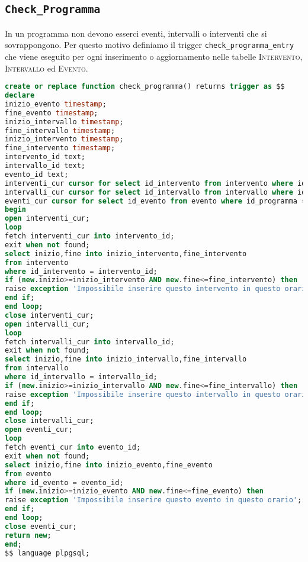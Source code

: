 \subsection{\texttt{Check\_Programma}}
In un programma non devono esserci eventi, intervalli o interventi che si sovrappongono. Per questo motivo definiamo il trigger \texttt{check\_programma\_entry} che viene eseguito per ogni inserimento o aggiornamento nelle tabelle \textsc{Intervento}, \textsc{Intervallo} ed \textsc{Evento}.
\begin{lstlisting}[language=SQL,style=mystyle,caption={check\_programma\_entry}]
create or replace function check_programma() returns trigger as $$
declare
inizio_evento timestamp;
fine_evento timestamp;
inizio_intervallo timestamp;
fine_intervallo timestamp;
inizio_intervento timestamp;
fine_intervento timestamp;
intervento_id text;
intervallo_id text;
evento_id text;
interventi_cur cursor for select id_intervento from intervento where id_programma = new.id_programma;
intervalli_cur cursor for select id_intervallo from intervallo where id_programma = new.id_programma;
eventi_cur cursor for select id_evento from evento where id_programma = new.id_programma;
begin
open interventi_cur;
loop 
fetch interventi_cur into intervento_id;
exit when not found;
select inizio,fine into inizio_intervento,fine_intervento
from intervento
where id_intervento = intervento_id;
if (new.inizio>=inizio_intervento AND new.fine<=fine_intervento) then
raise exception 'Impossibile inserire questo intervento in questo orario';
end if;
end loop;
close interventi_cur;
open intervalli_cur;
loop 
fetch intervalli_cur into intervallo_id;
exit when not found;
select inizio,fine into inizio_intervallo,fine_intervallo
from intervallo
where id_intervallo = intervallo_id;
if (new.inizio>=inizio_intervallo AND new.fine<=fine_intervallo) then
raise exception 'Impossibile inserire questo intervallo in questo orario';
end if;
end loop;
close intervalli_cur;
open eventi_cur;
loop 
fetch eventi_cur into evento_id;
exit when not found;
select inizio,fine into inizio_evento,fine_evento
from evento
where id_evento = evento_id;
if (new.inizio>=inizio_evento AND new.fine<=fine_evento) then
raise exception 'Impossibile inserire questo evento in questo orario';
end if;
end loop;
close eventi_cur;
return new;
end;
$$ language plpgsql;
\end{lstlisting}

